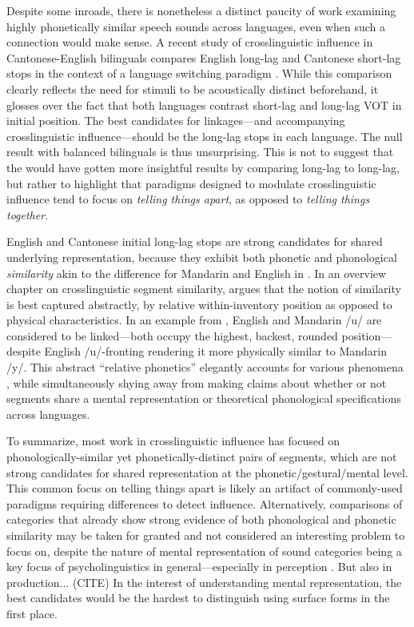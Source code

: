 Despite some inroads, there is nonetheless a distinct paucity of work examining highly phonetically similar speech sounds across languages, even when such a connection would make sense. A recent study of crosslinguistic influence in Cantonese-English bilinguals compares English long-lag and Cantonese short-lag stops in the context of a language switching paradigm \citep{tsui_2019_switching}. While this comparison clearly reflects the need for stimuli to be acoustically distinct beforehand, it glosses over the fact that both languages contrast short-lag and long-lag VOT in initial position. The best candidates for linkages---and accompanying crosslinguistic influence---should be the long-lag stops in each language. The null result with balanced bilinguals is thus unsurprising. This is not to suggest that the \citep{tsui_2019_switching} would have gotten more insightful results by comparing long-lag to long-lag, but rather to highlight that paradigms designed to modulate crosslinguistic influence tend to focus on \textit{telling things apart}, as opposed to \textit{telling things together}. %
 
English and Cantonese initial long-lag stops are strong candidates for shared underlying representation, because they exhibit both phonetic and phonological \textit{similarity} akin to the difference for Mandarin and English in \citep{yang_2019_vot}. In an overview chapter on crosslinguistic segment similarity, \citep{chang_2015_similarity} argues that the notion of similarity is best captured abstractly, by relative within-inventory position as opposed to physical characteristics. In an example from \citep{chang_2015_similarity}, English and Mandarin /u/ are considered to be linked---both occupy the highest, backest, rounded position---despite English /u/-fronting rendering it more physically similar to Mandarin /y/. This abstract ``relative phonetics'' elegantly accounts for various phenomena \citep{chang_2015_similarity}, while simultaneously shying away from making claims about whether or not segments share a mental representation or theoretical phonological specifications across languages. 

To summarize, most work in crosslinguistic influence has focused on phonologically-similar yet phonetically-distinct pairs of segments, which are not strong candidates for shared representation at the phonetic/gestural/mental level. This common focus on telling things apart is likely an artifact of commonly-used paradigms requiring differences to detect influence. Alternatively, comparisons of categories that already show strong evidence of both phonological and phonetic similarity may be taken for granted and not considered an interesting problem to focus on, despite the nature of mental representation of sound categories being a key focus of psycholinguistics in general---especially in perception \citep{samuel_2020_resist}. But also in production... (CITE) In the interest of understanding mental representation, the best candidates would be the hardest to distinguish using surface forms in the first place. 

